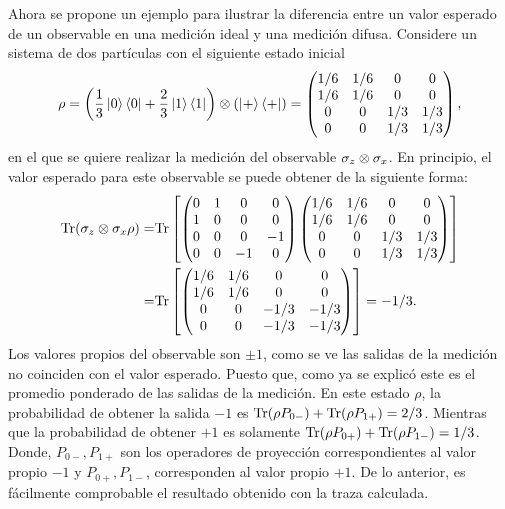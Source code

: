 Ahora se propone un ejemplo para ilustrar la diferencia entre un valor esperado de un observable en una medición ideal y una medición difusa. Considere un sistema de dos partículas con el siguiente estado inicial \[\rho= \left(\frac{1}{3}\ket{0}\bra{0}+\frac{2}{3}\ket{1}\bra{1}\right)\otimes\left(\ket{+}\bra{+}\right)=\begin{pmatrix}
    1/6&1/6&0&0\\
    1/6&1/6&0&0\\
    0&0&1/3&1/3\\
    0&0&1/3&1/3\\
\end{pmatrix},\] en el que se quiere realizar la medición del observable $\sigma_z\otimes\sigma_x$. En principio, el valor esperado para este observable se puede obtener de la siguiente forma:
\[\begin{split}
    {\rm Tr}(\sigma_z\otimes\sigma_x \rho) =& {\rm Tr}\left[ \begin{pmatrix}
    0&1&0&0\\
    1&0&0&0\\
    0&0&0&-1\\
    0&0&-1&0\\
\end{pmatrix}\begin{pmatrix}
    1/6&1/6&0&0\\
    1/6&1/6&0&0\\
    0&0&1/3&1/3\\
    0&0&1/3&1/3\\
\end{pmatrix}\right]\\
=& {\rm Tr}\left[ \begin{pmatrix}
    1/6&1/6&0&0\\
    1/6&1/6&0&0\\
    0&0&-1/3&-1/3\\
    0&0&-1/3&-1/3\\
\end{pmatrix}\right]=-1/3. \end{split}\] Los valores propios del observable son $\pm 1$, como se ve las salidas de la medición no coinciden con el valor esperado. Puesto que, como ya se explicó este es el promedio ponderado de las salidas de la medición.  En este estado $\rho$, la probabilidad de obtener  la salida $-1$ es ${\rm Tr}(\rho P_{0-})+{\rm Tr}(\rho P_{1+})=2/3$. Mientras que la probabilidad de obtener $+1$ es solamente ${\rm Tr}(\rho P_{0+})+{\rm Tr}(\rho P_{1-})=1/3$. Donde, $ P_{0-}, P_{1+}$ son los operadores de proyección correspondientes al valor propio $-1$ y $ P_{0+}, P_{1-}$, corresponden al valor propio $+1$. De lo anterior, es fácilmente comprobable el resultado obtenido con la traza calculada.

